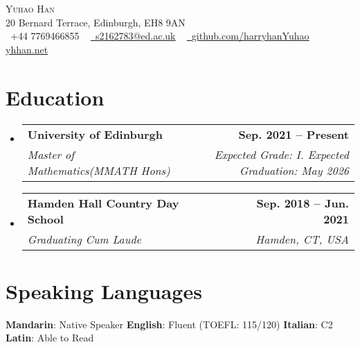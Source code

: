 \documentclass[letterpaper,11pt]{article}
\makeatletter
\newcommand{\resumeSubheading}[4]{
  \vspace{-2pt}\item
    \begin{tabular*}{1.0\textwidth}[t]{l@{\extracolsep{\fill}}r}
      \textbf{#1} & \textbf{\small #2} \\
      \textit{\small#3} & \textit{\small #4} \\
    \end{tabular*}\vspace{-7pt}
}
\newcommand{\resumeSubHeadingListStart}{\begin{itemize}[leftmargin=0.0in, label={}]}
\newcommand{\resumeSubHeadingListEnd}{\end{itemize}}
\makeatother
\begin{document}

\begin{center}
    {\Huge \scshape Yuhao Han} \\ \vspace{1pt}
	20 Bernard Terrace, Edinburgh, EH8 9AN
    \\ \vspace{1pt}
    \small \raisebox{-0.1\height}\faPhone\ +44 7769466855 ~ \href{mailto:s2162783@ed.ac.uk}{\raisebox{-0.2\height}\faEnvelope\  \underline{s2162783@ed.ac.uk}} ~ 
    \href{https://github.com/harryhanYuhao}{\raisebox{-0.2\height}\faGithub\ \underline{github.com/harryhanYuhao}} ~
    \href{https://yhhan.net}{\raisebox{-0.2\height}\faChain \underline{yhhan.net}} ~

    \vspace{-8pt}
\end{center}


\section{Education}
  \resumeSubHeadingListStart
    \resumeSubheading
      {University of Edinburgh}{Sep. 2021 -- Present}
      {Master of Mathematics(MMATH Hons)}{Expected Grade: I. Expected Graduation: May 2026}
    \resumeSubheading
      {Hamden Hall Country Day School}{Sep. 2018 -- Jun. 2021}
      {Graduating Cum Laude}{Hamden, CT, USA}
  \resumeSubHeadingListEnd

\section{Speaking Languages}
\begin{multicols}{2}
        \textbf{Mandarin}: Native Speaker \hfill
        \textbf{English}: Fluent (TOEFL: 115/120) \hfill
        \textbf{Italian}: C2 \hfill
        \textbf{Latin}: Able to Read \hfill
 \end{multicols}
\end{document}
